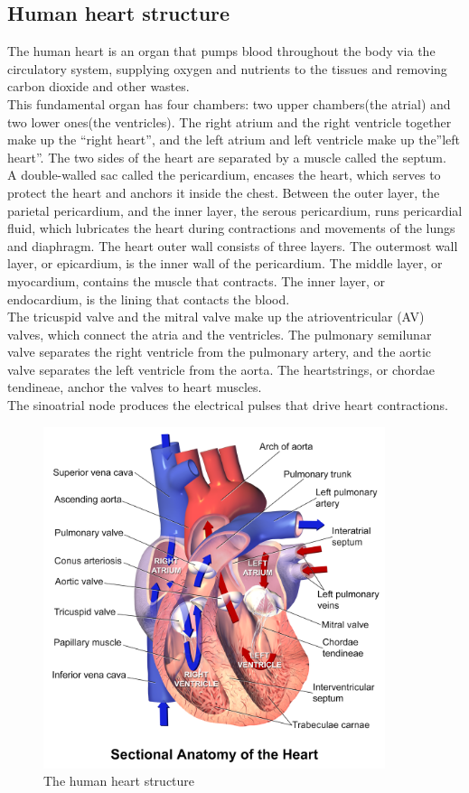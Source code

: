 \subsection{Human heart structure}
The human heart is an organ that pumps blood throughout the body via the circulatory system, supplying oxygen and nutrients to the tissues and removing carbon dioxide and other wastes.\\
This fundamental organ has four chambers: two upper chambers(the atrial) and two lower ones(the ventricles). The right atrium and the right ventricle together make up the “right heart”, and the left atrium and left ventricle make up the”left heart”. The two sides of the heart are separated by a muscle called the septum. \\
A double-walled sac called the pericardium, encases the heart, which serves to protect the heart and anchors it inside the chest. Between the outer layer, the parietal pericardium, and the inner layer, the serous pericardium, runs pericardial fluid, which lubricates the heart during contractions and movements of the lungs and diaphragm.
The heart outer wall consists of three layers. The outermost wall layer, or epicardium, is the inner wall of the pericardium.  The middle layer, or myocardium, contains the muscle that contracts. The inner layer, or endocardium, is the lining that contacts the blood.\\
The tricuspid valve and the mitral valve make up the atrioventricular (AV) valves, which connect the atria and the ventricles. The pulmonary semilunar valve separates the right ventricle from the pulmonary artery, and the aortic valve separates the left ventricle from the aorta. The heartstrings, or chordae tendineae, anchor the valves to heart muscles.\\
The sinoatrial node produces the electrical pulses that drive heart contractions.
\begin{figure}[ht!]
\centering
\includegraphics[width=100mm]{figures/ch2/human_heart_structure.png}
\caption{The human heart structure \label{overflow}}
\label{fig1.1}
\end{figure}